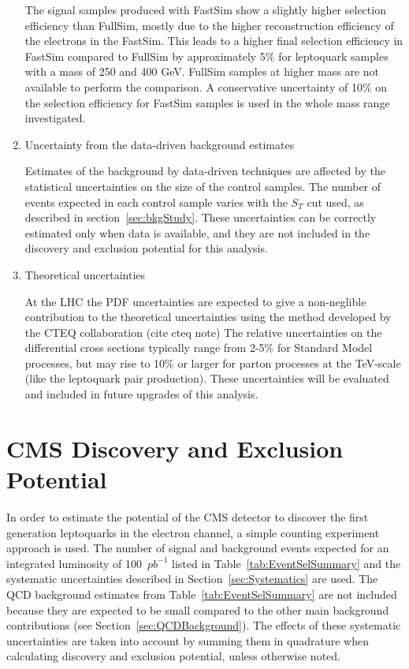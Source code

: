 \documentclass{cmspaper}
\begin{document}
\begin{linenumbers}
\begin{enumerate}
The signal samples produced with FastSim show a slightly higher selection efficiency than FullSim, 
mostly due to the higher reconstruction efficiency of the electrons in the FastSim. 
This leads to a higher final selection efficiency in FastSim compared to FullSim by approximately 5\% 
for leptoquark samples with a mass of 250 and 400 GeV. FullSim samples at higher mass are not available 
to perform the comparison. A conservative uncertainty of 10\% on the selection efficiency 
for FastSim samples is used in the whole mass range investigated. 
%
\item Uncertainty from the data-driven background estimates

Estimates of the background by data-driven techniques are affected by the statistical
uncertainties on the size of the control samples.
The number of events expected in each control sample varies with the $S_T$ cut used, as 
described in section~\ref{sec:bkgStudy}. These uncertainties can be correctly estimated 
only when data is available, and they are not included in the discovery and exclusion potential
for this analysis.
%
\item Theoretical uncertainties 

At the LHC the PDF uncertainties are expected to give a non-neglible
contribution to the theoretical uncertainties using the
method developed by the CTEQ collaboration (cite cteq note)
The relative uncertainties on the differential cross sections 
typically range from 2-5\% for Standard Model processes, 
but may rise to 10\% or larger for parton processes at the TeV-scale 
(like the leptoquark pair production).
These uncertainties will be evaluated and included in future upgrades of this analysis.
\end{enumerate}



\section{CMS Discovery and Exclusion Potential} \label{CMSpotential}

In order to estimate the potential of the CMS detector to discover the first generation leptoquarks
in the electron channel, a simple counting experiment approach is used. 
The number of signal and background events expected for an integrated luminosity of
100~$pb^{-1}$ listed in Table~\ref{tab:EventSelSummary} and the systematic uncertainties described 
in Section~\ref{sec:Systematics} are used. 
The QCD background estimates from Table~\ref{tab:EventSelSummary} 
are not included because they are expected to be 
small compared to the other main background contributions (see Section~\ref{sec:QCDBackground}).
The effects of these systematic uncertainties are taken into account
by summing them in quadrature when calculating discovery and exclusion potential, unless otherwise noted.



\end{linenumbers}
\end{document}
